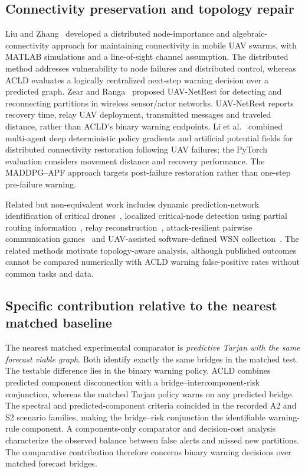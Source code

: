 \documentclass[preprint,12pt]{elsarticle}
\theoremstyle{definition}\newtheorem{definition}{Definition}
\theoremstyle{plain}\newtheorem{theorem}{Theorem}
\theoremstyle{plain}\newtheorem{lemma}{Lemma}
\theoremstyle{plain}\newtheorem{corollary}{Corollary}
\theoremstyle{plain}\newtheorem{assumption}{Assumption}
\theoremstyle{remark}\newtheorem{remark}[theorem]{Remark}
\begin{document}
\subsection{Connectivity preservation and topology repair}
Liu and Zhang~\cite{liu2022robust} developed a distributed node-importance and algebraic-connectivity approach for maintaining connectivity in mobile UAV swarms, with MATLAB simulations and a line-of-sight channel assumption. The distributed method addresses vulnerability to node failures and distributed control, whereas ACLD evaluates a logically centralized next-step warning decision over a predicted graph. Zear and Ranga~\cite{zear2022UAVs} proposed UAV-NetRest for detecting and reconnecting partitions in wireless sensor/actor networks. UAV-NetRest reports recovery time, relay UAV deployment, transmitted messages and traveled distance, rather than ACLD's binary warning endpoints. Li et al.~\cite{li2025fast} combined multi-agent deep deterministic policy gradients and artificial potential fields for distributed connectivity restoration following UAV failures; the PyTorch evaluation considers movement distance and recovery performance. The MADDPG--APF approach targets post-failure restoration rather than one-step pre-failure warning.

Related but non-equivalent work includes dynamic prediction-network identification of critical drones~\cite{teng2024communication}, localized critical-node detection using partial routing information~\cite{jin2017localized}, relay reconstruction~\cite{park2018droneNetXNR}, attack-resilient pairwise communication games~\cite{yang2019attack} and UAV-assisted software-defined WSN collection~\cite{Karegar2025Wireless}. The related methods motivate topology-aware analysis, although published outcomes cannot be compared numerically with ACLD warning false-positive rates without common tasks and data.

\subsection{Specific contribution relative to the nearest matched baseline}
The nearest matched experimental comparator is \emph{predictive Tarjan with the same forecast viable graph}. Both identify exactly the same bridges in the matched test. The testable difference lies in the binary warning policy. ACLD combines predicted component disconnection with a bridge--intercomponent-risk conjunction, whereas the matched Tarjan policy warns on any predicted bridge. The spectral and predicted-component criteria coincided in the recorded A2 and S2 scenario families, making the bridge--risk conjunction the identifiable warning-rule component. A components-only comparator and decision-cost analysis characterize the observed balance between false alerts and missed new partitions. The comparative contribution therefore concerns binary warning decisions over matched forecast bridges.
\end{document}
